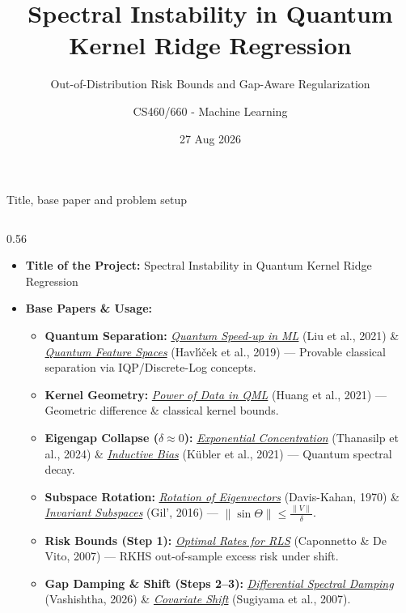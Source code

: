 \documentclass[aspectratio=169, 10pt]{beamer}
\title{Spectral Instability in Quantum Kernel Ridge Regression}
\subtitle{Out-of-Distribution Risk Bounds and Gap-Aware Regularization}
\author{CS460/660 - Machine Learning}
\date{27 Aug 2026}
\begin{document}
\begin{frame}{Title, base paper and problem setup}
\vspace{-0.3cm}
\begin{columns}[T]
    \begin{column}{0.56\textwidth}
        \begin{itemize}\setlength{\itemsep}{1pt}
            \item \textbf{Title of the Project:} Spectral Instability in Quantum Kernel Ridge Regression
            
            \item \textbf{Base Papers \& Usage:}
            \begin{itemize}\setlength{\itemsep}{0.8pt}
                \item \textbf{Quantum Separation:} \href{https://doi.org/10.1038/s41567-021-01287-z}{\textit{Quantum Speed-up in ML}} (Liu et al., 2021) \& \href{https://doi.org/10.1038/s41586-019-0980-2}{\textit{Quantum Feature Spaces}} (Havl{\'\i}{\v{c}}ek et al., 2019) --- Provable classical separation via IQP/Discrete-Log concepts.
                \item \textbf{Kernel Geometry:} \href{https://doi.org/10.1038/s41467-021-22539-9}{\textit{Power of Data in QML}} (Huang et al., 2021) --- Geometric difference \& classical kernel bounds.
                \item \textbf{Eigengap Collapse ($\delta \approx 0$):} \href{https://doi.org/10.1038/s41467-024-49287-w}{\textit{Exponential Concentration}} (Thanasilp et al., 2024) \& \href{https://arxiv.org/abs/2106.03747}{\textit{Inductive Bias}} (K{\"u}bler et al., 2021) --- Quantum spectral decay.
                \item \textbf{Subspace Rotation:} \href{https://doi.org/10.1137/0707001}{\textit{Rotation of Eigenvectors}} (Davis-Kahan, 1970) \& \href{https://doi.org/10.14232/actasm-015-514-y}{\textit{Invariant Subspaces}} (Gil', 2016) --- $\|\sin\Theta\| \le \frac{\|V\|}{\delta}$.
                \item \textbf{Risk Bounds (Step 1):} \href{https://doi.org/10.1007/s10208-006-0196-8}{\textit{Optimal Rates for RLS}} (Caponnetto \& De Vito, 2007) --- RKHS out-of-sample excess risk under shift.
                \item \textbf{Gap Damping \& Shift (Steps 2--3):} \href{https://arxiv.org/abs/2606.23407}{\textit{Differential Spectral Damping}} (Vashishtha, 2026) \& \href{https://www.jmlr.org/papers/v8/sugiyama07a.html}{\textit{Covariate Shift}} (Sugiyama et al., 2007).
            \end{itemize}


\end{itemize}
\end{column}
\end{columns}
\end{frame}
\end{document}
